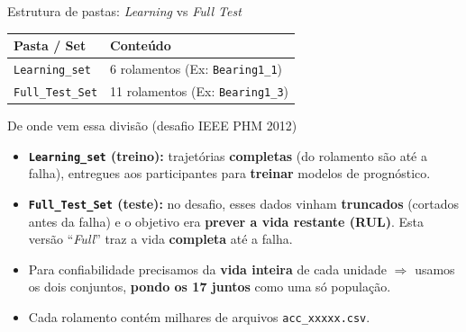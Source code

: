 \documentclass{beamer}
\begin{document}
\begin{frame}[fragile]{Estrutura de pastas: \textit{Learning} vs \textit{Full Test}}
    \footnotesize
    \begin{tabular}{ll}
        \toprule
        \textbf{Pasta / Set} & \textbf{Conteúdo} \\
        \midrule
        \texttt{Learning\_set} & 6 rolamentos (Ex: \texttt{Bearing1\_1}) \\
        \texttt{Full\_Test\_Set} & 11 rolamentos (Ex: \texttt{Bearing1\_3}) \\
        \bottomrule
    \end{tabular}
    \normalsize
    \vspace{0.15cm}
    \begin{block}{De onde vem essa divisão (desafio IEEE PHM 2012)}
        \footnotesize
        \begin{itemize}\setlength{\itemsep}{2pt}
            \item \textbf{\texttt{Learning\_set} (treino):} trajetórias \textbf{completas} (do rolamento são até a falha), entregues aos participantes para \textbf{treinar} modelos de prognóstico.
            \item \textbf{\texttt{Full\_Test\_Set} (teste):} no desafio, esses dados vinham \textbf{truncados} (cortados antes da falha) e o objetivo era \textbf{prever a vida restante (RUL)}. Esta versão ``\textit{Full}'' traz a vida \textbf{completa} até a falha.
        \end{itemize}
    \end{block}
    \vspace{0.05cm}
    \begin{itemize}\setlength{\itemsep}{1pt}
        \item Para confiabilidade precisamos da \textbf{vida inteira} de cada unidade $\Rightarrow$ usamos os dois conjuntos, \textbf{pondo os 17 juntos} como uma só população.
        \item Cada rolamento contém milhares de arquivos \texttt{acc\_xxxxx.csv}.
    \end{itemize}
\end{frame}
\end{document}
